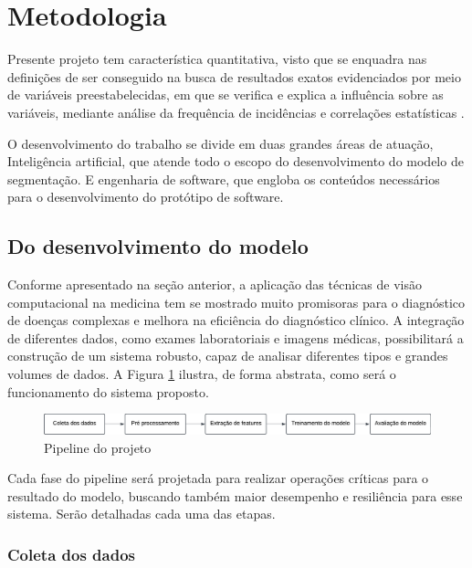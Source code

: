 


\section{Metodologia}

%

Presente projeto tem característica quantitativa, visto que se enquadra nas definições de ser conseguido na busca de resultados exatos evidenciados por meio de variáveis preestabelecidas, em que se verifica e explica a influência sobre as variáveis, mediante análise da frequência de incidências e correlações estatísticas \cite{michelmetodologia}.

O desenvolvimento do trabalho se divide em duas grandes áreas de atuação, Inteligência artificial, que atende todo o escopo do desenvolvimento do modelo de segmentação. E engenharia de software, que engloba os conteúdos necessários para o desenvolvimento do protótipo de software.

\subsection{Do desenvolvimento do modelo}

Conforme apresentado na seção anterior, a aplicação das técnicas de visão computacional na medicina tem se mostrado muito promisoras para o diagnóstico de doenças complexas e melhora na eficiência do diagnóstico clínico. A integração de diferentes dados, como exames laboratoriais e imagens médicas, possibilitará a construção de um sistema robusto, capaz de analisar diferentes tipos e grandes volumes de dados. A Figura \ref{fig:pipeline} ilustra, de forma abstrata, como será o funcionamento do sistema proposto.

\begin{figure}[h]
    \centering
    \includegraphics[scale=0.15]{images/pipeline2.png}
    \caption{Pipeline do projeto}
    \label{fig:pipeline}
\end{figure}

Cada fase do pipeline será projetada para realizar operações críticas para o resultado do modelo, buscando também maior desempenho e resiliência para esse sistema. Serão detalhadas cada uma das etapas.

\subsubsection{Coleta dos dados}

